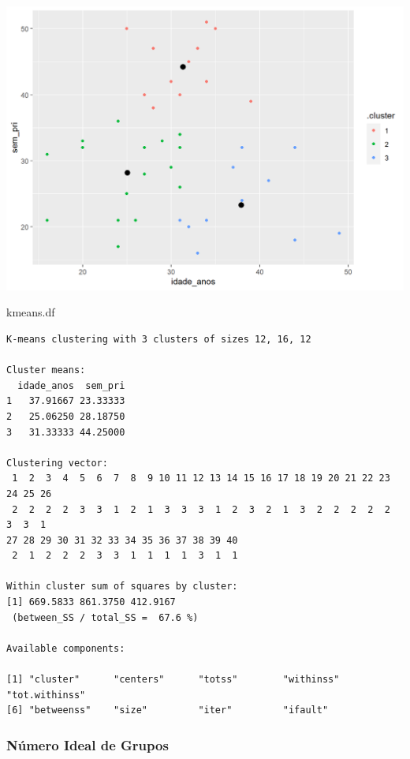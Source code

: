 \documentclass[
  letterpaper,
  DIV=11,
  numbers=noendperiod]{scrreprt}
\newenvironment{Shaded}{\begin{snugshade}}{\end{snugshade}}
\newcommand{\NormalTok}[1]{\textcolor[rgb]{0.00,0.23,0.31}{#1}}
\begin{document}
\includegraphics{./figuras_naosupervisionado/unnamed-chunk-16-1.png}

\begin{Shaded}
\begin{Highlighting}[]
\NormalTok{kmeans.df}
\end{Highlighting}
\end{Shaded}

\begin{verbatim}
K-means clustering with 3 clusters of sizes 12, 16, 12

Cluster means:
  idade_anos  sem_pri
1   37.91667 23.33333
2   25.06250 28.18750
3   31.33333 44.25000

Clustering vector:
 1  2  3  4  5  6  7  8  9 10 11 12 13 14 15 16 17 18 19 20 21 22 23 24 25 26 
 2  2  2  2  3  3  1  2  1  3  3  3  1  2  3  2  1  3  2  2  2  2  2  3  3  1 
27 28 29 30 31 32 33 34 35 36 37 38 39 40 
 2  1  2  2  2  3  3  1  1  1  1  3  1  1 

Within cluster sum of squares by cluster:
[1] 669.5833 861.3750 412.9167
 (between_SS / total_SS =  67.6 %)

Available components:

[1] "cluster"      "centers"      "totss"        "withinss"     "tot.withinss"
[6] "betweenss"    "size"         "iter"         "ifault"      
\end{verbatim}

\hypertarget{nuxfamero-ideal-de-grupos}{%
\subsubsection{Número Ideal de Grupos}\label{nuxfamero-ideal-de-grupos}}
\end{document}
